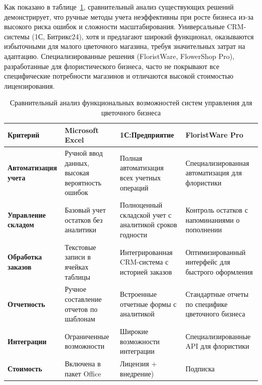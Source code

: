 Как показано в таблице~\ref{tab:comparison}, сравнительный анализ существующих решений демонстрирует, что ручные методы учета неэффективны при росте бизнеса из-за высокого риска ошибок и сложности масштабирования. Универсальные CRM-системы (1С, Битрикс24), хотя и предлагают широкий функционал, оказываются избыточными для малого цветочного магазина, требуя значительных затрат на адаптацию. Специализированные решения (FloristWare, FlowerShop Pro), разработанные для флористического бизнеса, часто не покрывают все специфические потребности магазинов и отличаются высокой стоимостью лицензирования.
\begin{table}[h]
	\centering
	\caption{Сравнительный анализ функциональных возможностей систем управления для цветочного бизнеса}
	\label{tab:comparison}
	\begin{tabularx}{\textwidth}{XXXX}
		\toprule
		\textbf{Критерий} & 
		\textbf{Microsoft Excel} & 
		\textbf{1С:Предприятие} & 
		\textbf{FloristWare Pro} \\
		\midrule
		
		\textbf{Автоматизация учета} & 
		Ручной ввод данных, высокая вероятность ошибок & 
		Полная автоматизация всех учетных операций & 
		Специализированная автоматизация для флористики \\
		
		\textbf{Управление складом} & 
		Базовый учет остатков без аналитики & 
		Полноценный складской учет с аналитикой сроков годности & 
		Контроль остатков с напоминаниями о пополнении \\
		
		\textbf{Обработка заказов} & 
		Текстовые записи в ячейках таблицы & 
		Интегрированная CRM-система с историей заказов & 
		Оптимизированный интерфейс для быстрого оформления \\
		
		\textbf{Отчетность} & 
		Ручное составление отчетов по шаблонам & 
		Встроенные отчетные формы с аналитикой & 
		Стандартные отчеты по специфике цветочного бизнеса \\
		
		\textbf{Интеграции} & 
		Ограниченные возможности & 
		Широкие возможности интеграции & 
		Специализированные API для флористики \\
		
		\textbf{Стоимость} & 
		Включена в пакет Office & 
		Лицензия + внедрение) & 
		Подписка \\
		\bottomrule
	\end{tabularx}
\end{table}

